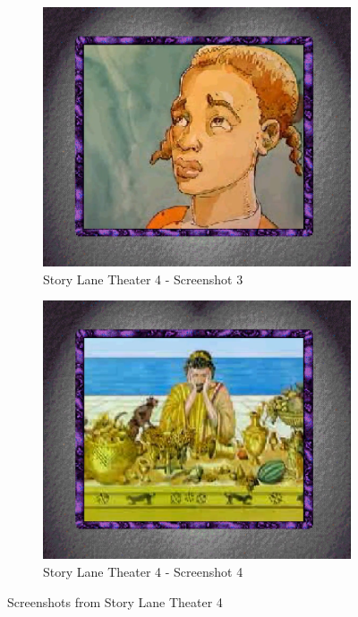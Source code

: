 \begin{figure}[H]
    \begin{subfigure}{0.45\textwidth}
        \centering
        \includegraphics[width=\linewidth]{Games/StoryLaneTheater/Images/StoryLaneTheater4Image3.png}
        \caption{Story Lane Theater 4 - Screenshot 3}
    \end{subfigure}
    \begin{subfigure}{0.45\textwidth}
        \centering
        \includegraphics[width=\linewidth]{Games/StoryLaneTheater/Images/StoryLaneTheater4Image4.png}
        \caption{Story Lane Theater 4 - Screenshot 4}
    \end{subfigure}
    \caption{Screenshots from Story Lane Theater 4}
\end{figure}